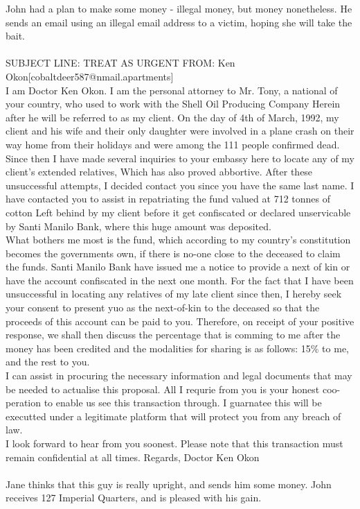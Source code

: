 \documentclass{article}
\begin{document}
John had a plan to make some money {-} illegal money, but money nonetheless.
He sends an email using an illegal email address to a victim, hoping she will take the bait.
\\\\
SUBJECT LINE: TREAT AS URGENT
FROM: Ken Okon[cobaltdeer587@nmail.apartments]
\\
I am Doctor Ken Okon.
I am the personal attorney to Mr. Tony, a national of your country, who used to work with the Shell Oil Producing Company
Herein after he will be referred to as my client.
On the day of 4th of March, 1992, my client and his wife and their only daughter were involved in a plane crash on their way home from their holidays and were among the 111 people confirmed dead.
\\
Since then I have made several inquiries to your embassy here to locate any of my client's extended relatives, Which has also proved abbortive.
After these unsuccessful attempts, I decided contact you since you have the same last name.
I have contacted you to assist in repatriating the fund valued at 712 tonnes of cotton Left behind by my client before it get confiscated or declared unservicable by Santi Manilo Bank, where this huge amount was deposited.
\\
What bothers me most is the fund, which according to my country's constitution becomes the governments own, if there is no{-}one close to the deceased to claim the funds.
Santi Manilo Bank have issued me a notice to provide a next of kin or have the account confiscated in the next one month.
For the fact that I have been unsuccessful in locating any relatives of my late client since then, I hereby seek your consent to present yuo as the next{-}of{-}kin to the deceased so that the proceeds of this account can be paid to you.
Therefore, on receipt of your positive response, we shall then discuss the percentage that is comming to me after the money has been credited and the modalities for sharing is as follows: 15\% to me, and the rest to you.
\\
I can assist in procuring the necessary information and legal documents that may be needed to actualise this proposal.
All I requrie from you is your honest coo{-}peration to enable us see this transaction through.
I guarnatee this will be executted under a legitimate platform that will protect you from any breach of law.
\\
I look forward to hear from you soonest.
Please note that this transaction must remain confidential at all times.
Regards, Doctor Ken Okon
\\\\
Jane thinks that this guy is really upright, and sends him some money.
John receives 127 Imperial Quarters, and is pleased with his gain.
\end{document}
